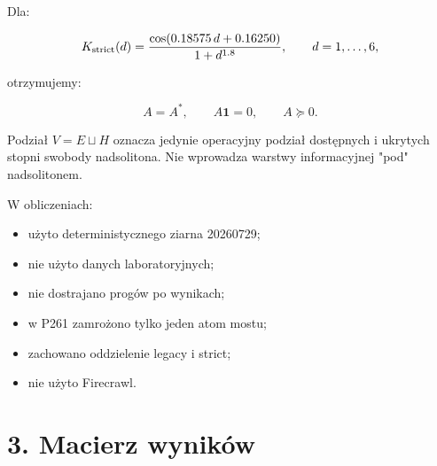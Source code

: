 \documentclass[11pt,a4paper,openany]{report}
\begin{document}
Dla:

\[
K_{\rm strict}(d)
=
\frac{\cos(0.18575\,d+0.16250)}{1+d^{1.8}},
\qquad d=1,\ldots,6,
\]

otrzymujemy:

\[
A=A^\ast,\qquad A\mathbf 1=0,\qquad A\succeq0.
\]

Podział \(V=E\sqcup H\) oznacza jedynie operacyjny podział dostępnych i ukrytych stopni swobody nadsolitona. Nie wprowadza warstwy informacyjnej "pod" nadsolitonem.

W obliczeniach:

\begin{itemize}
\item 
u\.zyto deterministycznego ziarna 20260729;

\item 
nie u\.zyto danych laboratoryjnych;

\item 
nie dostrajano progów po wynikach;

\item 
w P261 zamro\.zono tylko jeden atom mostu;

\item 
zachowano oddzielenie legacy i strict;

\item 
nie u\.zyto Firecrawl.

\end{itemize}

\chapter{3. Macierz wyników}
\end{document}
